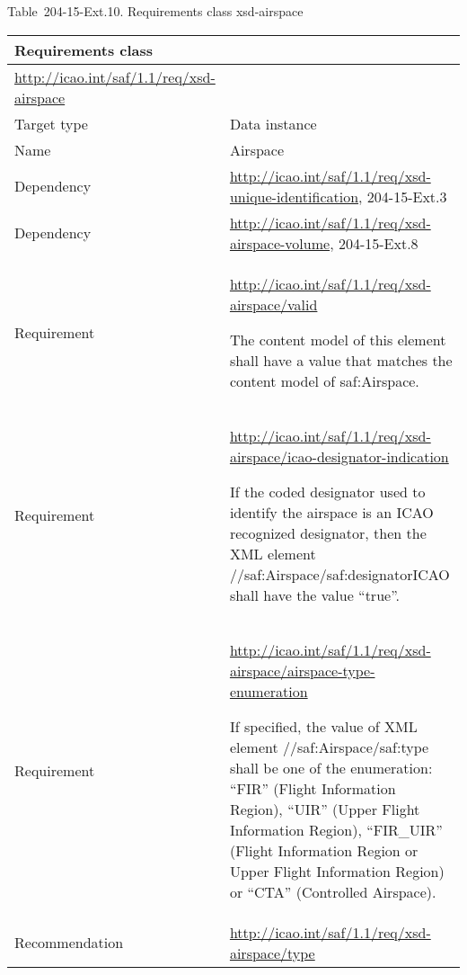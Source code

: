 Table~204-15-Ext.10. Requirements class xsd-airspace

\begin{longtable}[]{@{}ll@{}}
\toprule
Requirements class &\tabularnewline
\midrule
\endhead
\url{http://icao.int/saf/1.1/req/xsd-airspace} &\tabularnewline
Target type & Data instance\tabularnewline
Name & Airspace\tabularnewline
Dependency & \url{http://icao.int/saf/1.1/req/xsd-unique-identification}, 204-15-Ext.3\tabularnewline
Dependency & \url{http://icao.int/saf/1.1/req/xsd-airspace-volume}, 204-15-Ext.8\tabularnewline
\begin{minipage}[t]{0.47\columnwidth}\raggedright
Requirement\strut
\end{minipage} & \begin{minipage}[t]{0.47\columnwidth}\raggedright
\url{http://icao.int/saf/1.1/req/xsd-airspace/valid}

The content model of this element shall have a value that matches the content model of saf:Airspace.\strut
\end{minipage}\tabularnewline
\begin{minipage}[t]{0.47\columnwidth}\raggedright
Requirement\strut
\end{minipage} & \begin{minipage}[t]{0.47\columnwidth}\raggedright
\url{http://icao.int/saf/1.1/req/xsd-airspace/icao-designator-indication}

If the coded designator used to identify the airspace is an ICAO recognized designator, then the XML element //saf:Airspace/saf:designatorICAO shall have the value ``true''.\strut
\end{minipage}\tabularnewline
\begin{minipage}[t]{0.47\columnwidth}\raggedright
Requirement\strut
\end{minipage} & \begin{minipage}[t]{0.47\columnwidth}\raggedright
\url{http://icao.int/saf/1.1/req/xsd-airspace/airspace-type-enumeration}

If specified, the value of XML element //saf:Airspace/saf:type shall be one of the enumeration: ``FIR'' (Flight Information Region), ``UIR'' (Upper Flight Information Region), ``FIR\_UIR'' (Flight Information Region or Upper Flight Information Region) or ``CTA'' (Controlled Airspace).\strut
\end{minipage}\tabularnewline
\begin{minipage}[t]{0.47\columnwidth}\raggedright
Recommendation\strut
\end{minipage} & \begin{minipage}[t]{0.47\columnwidth}\raggedright
\url{http://icao.int/saf/1.1/req/xsd-airspace/type}


\end{minipage}
\end{longtable}
